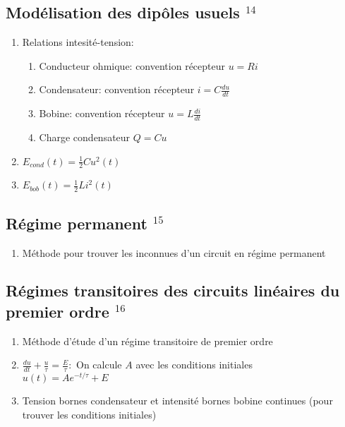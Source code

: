 \documentclass[fleqn]{article}
\theoremstyle{definition} \newtheorem*{defi}{D\'efinition}
\theoremstyle{definition} \newtheorem*{theo}{Th\'eor\`eme}
\theoremstyle{definition} \newtheorem*{coro}{Corollaire}
\theoremstyle{remark} \newtheorem*{rqs}{Remarques}
\theoremstyle{definition} \newtheorem*{prop}{Propri\'et\'e}
\begin{document}
\subsection{Mod\'elisation des dip\^oles usuels $^{14}$}
\begin{enumerate}
	\item Relations intesit\'e-tension:
		\begin{enumerate}
			\item Conducteur ohmique: convention r\'ecepteur $u = Ri$
			\item Condensateur: convention r\'ecepteur $i = C\frac{du}{dt}$
			\item Bobine: convention r\'ecepteur $u = L\frac{di}{dt}$
			\item Charge condensateur $Q = Cu$
		\end{enumerate}
	\item $E_{cond}(t) = \frac{1}{2} Cu^2(t)$
	\item $E_{bob}(t) = \frac{1}{2} Li^2(t)$
\end{enumerate}

\subsection{R\'egime permanent $^{15}$}
\begin{enumerate}
	\item M\'ethode pour trouver les inconnues d'un circuit en r\'egime permanent
\end{enumerate}

\subsection{R\'egimes transitoires des circuits lin\'eaires du premier ordre $^{16}$}
\begin{enumerate}
	\item M\'ethode d'\'etude d'un r\'egime transitoire de premier ordre
	\item $\frac{du}{dt} + \frac{u}{\tau} = \frac{E}{\tau}:$ On calcule $A$ avec les conditions initiales \\
		$u(t) = Ae^{-t/\tau} + E$
	\item Tension bornes condensateur et intensit\'e bornes bobine continues (pour trouver les conditions initiales)
\end{enumerate}
\end{document}
